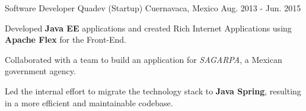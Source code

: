 \begin{cventries}
\cventry
{Software Developer} %
{Quadev (Startup)} %
{Cuernavaca, Mexico} %
{Aug. 2013 - Jun. 2015} %
{
    \begin{cvitems}
      \item {Developed \textbf{Java EE} applications and created Rich Internet Applications using \textbf{Apache Flex} for the Front-End.}
      \item {Collaborated with a team to build an application for \textit{SAGARPA}, a Mexican government agency.}
      \item {Led the internal effort to migrate the technology stack to \textbf{Java Spring}, 
      resulting in a more efficient and maintainable codebase.}
    \end{cvitems}
}

\end{cventries}
